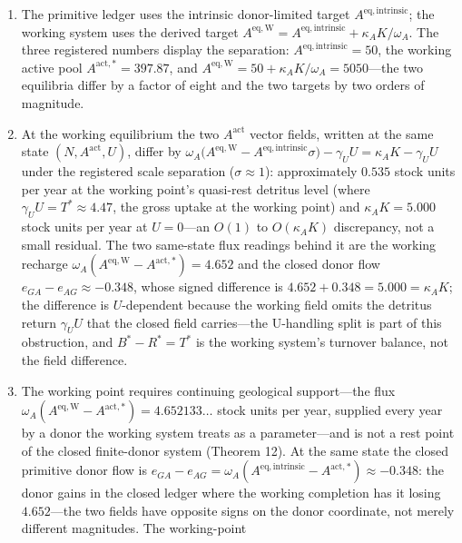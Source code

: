 \documentclass[11pt]{article}
\providecommand{\tightlist}{\setlength{\itemsep}{0pt}\setlength{\parskip}{0pt}}
\begin{document}
\begin{enumerate}
\def\labelenumi{\arabic{enumi}.}
\tightlist
\item
  The primitive ledger uses the intrinsic donor-limited target
  \(A^{\mathrm{eq,intrinsic}}\); the working system uses the derived
  target
  \(A^{\mathrm{eq,W}} = A^{\mathrm{eq,intrinsic}} + \kappa_A K/\omega_A\).
  The three registered numbers display the separation:
  \(A^{\mathrm{eq,intrinsic}} = 50\), the working active pool
  \(A^{\mathrm{act,*}} = 397.87\), and
  \(A^{\mathrm{eq,W}} = 50 + \kappa_A K/\omega_A = 5050\)---the two
  equilibria differ by a factor of eight and the two targets by two
  orders of magnitude.
\item
  At the working equilibrium the two \(A^{\mathrm{act}}\) vector fields,
  written at the same state \((N, A^{\mathrm{act}}, U)\), differ by
  \(\omega_A\bigl(A^{\mathrm{eq,W}} - A^{\mathrm{eq,intrinsic}}\sigma\bigr) - \gamma_U U = \kappa_A K - \gamma_U U\)
  under the registered scale separation (\(\sigma \approx 1\)):
  approximately \(0.535\) stock units per year at the working point's
  quasi-rest detritus level (where \(\gamma_U U = T^* \approx 4.47\),
  the gross uptake at the working point) and \(\kappa_A K = 5.000\)
  stock units per year at \(U = 0\)---an \(O(1)\) to \(O(\kappa_A K)\)
  discrepancy, not a small residual. The two same-state flux readings
  behind it are the working recharge
  \(\omega_A(A^{\mathrm{eq,W}} - A^{\mathrm{act,*}}) = 4.652\) and the
  closed donor flow \(e_{GA} - e_{AG} \approx -0.348\), whose signed
  difference is \(4.652 + 0.348 = 5.000 = \kappa_A K\); the difference
  is \(U\)-dependent because the working field omits the detritus return
  \(\gamma_U U\) that the closed field carries---the U-handling split
  is part of this obstruction, and \(B^* - R^* = T^*\) is the working
  system's turnover balance, not the field difference.
\item
  The working point requires continuing geological support---the flux
  \(\omega_A(A^{\mathrm{eq,W}} - A^{\mathrm{act,*}}) = 4.652133\ldots\)
  stock units per year, supplied every year by a donor the working
  system treats as a parameter---and is not a rest point of the closed
  finite-donor system (Theorem 12). At the same state the closed
  primitive donor flow is
  \(e_{GA} - e_{AG} = \omega_A(A^{\mathrm{eq,intrinsic}} - A^{\mathrm{act,*}}) \approx -0.348\):
  the donor gains in the closed ledger where the working completion has
  it losing \(4.652\)---the two fields have opposite signs on the
  donor coordinate, not merely different magnitudes. The working-point

\end{enumerate}
\end{document}
